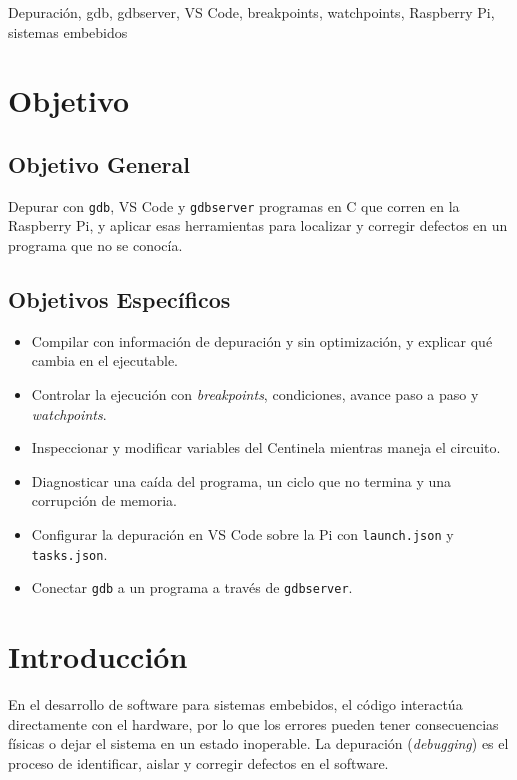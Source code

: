 \documentclass[conference]{IEEEtran}
\begin{document}
\begin{IEEEkeywords}
	Depuración, gdb, gdbserver, VS Code, breakpoints, watchpoints, Raspberry Pi, sistemas embebidos
\end{IEEEkeywords}

\section{Objetivo}

\subsection{Objetivo General}
Depurar con \texttt{gdb}, VS Code y \texttt{gdbserver} programas en C que corren en la Raspberry Pi, y aplicar esas herramientas para localizar y corregir defectos en un programa que no se conocía.

\subsection{Objetivos Específicos}
\begin{itemize}
	\item Compilar con información de depuración y sin optimización, y explicar qué cambia en el ejecutable.
	\item Controlar la ejecución con \textit{breakpoints}, condiciones, avance paso a paso y \textit{watchpoints}.
	\item Inspeccionar y modificar variables del Centinela mientras maneja el circuito.
	\item Diagnosticar una caída del programa, un ciclo que no termina y una corrupción de memoria.
	\item Configurar la depuración en VS Code sobre la Pi con \texttt{launch.json} y \texttt{tasks.json}.
	\item Conectar \texttt{gdb} a un programa a través de \texttt{gdbserver}.
\end{itemize}

\section{Introducción}

En el desarrollo de software para sistemas embebidos, el código interactúa directamente con el hardware, por lo que los errores pueden tener consecuencias físicas o dejar el sistema en un estado inoperable. La depuración (\textit{debugging}) es el proceso de identificar, aislar y corregir defectos en el software.
\end{document}
